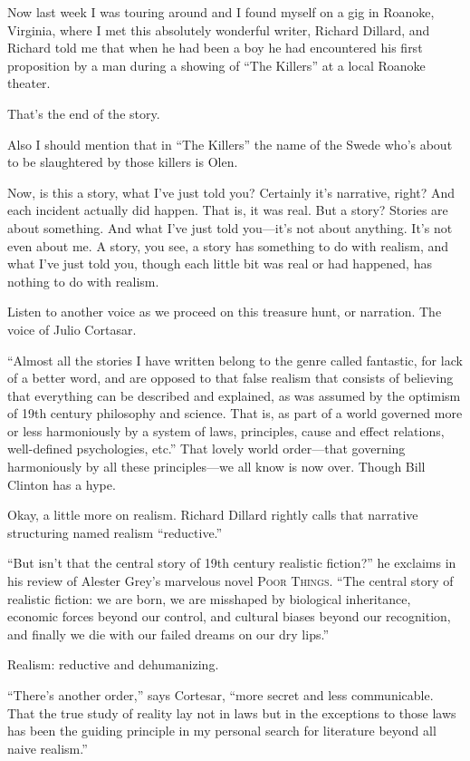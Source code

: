 \documentclass[
]{memoir}
\begin{document}
Now last week I was touring around and I found myself on a gig in
Roanoke, Virginia, where I met this absolutely wonderful writer, Richard
Dillard, and Richard told me that when he had been a boy he had
encountered his first proposition by a man during a showing of ``The
Killers'' at a local Roanoke theater.

That's the end of the story.

Also I should mention that in ``The Killers'' the name of the Swede
who's about to be slaughtered by those killers is Olen.

Now, is this a story, what I've just told you? Certainly it's narrative,
right? And each incident actually did happen. That is, it was real. But
a story? Stories are about something. And what I've just told you---it's
not about anything. It's not even about me. A story, you see, a story
has something to do with realism, and what I've just told you, though
each little bit was real or had happened, has nothing to do with
realism.

Listen to another voice as we proceed on this treasure hunt, or
narration. The voice of Julio Cortasar.

``Almost all the stories I have written belong to the genre called
fantastic, for lack of a better word, and are opposed to that false
realism that consists of believing that everything can be described and
explained, as was assumed by the optimism of 19th century philosophy and
science. That is, as part of a world governed more or less harmoniously
by a system of laws, principles, cause and effect relations,
well-defined psychologies, etc.'' That lovely world order---that
governing harmoniously by all these principles---we all know is now
over. Though Bill Clinton has a hype.

Okay, a little more on realism. Richard Dillard rightly calls that
narrative structuring named realism ``reductive.''

``But isn't that the central story of 19th century realistic fiction?''
he exclaims in his review of Alester Grey's marvelous novel \textsc{Poor
Things}. ``The central story of realistic fiction: we are born, we are
misshaped by biological inheritance, economic forces beyond our control,
and cultural biases beyond our recognition, and finally we die with our
failed dreams on our dry lips.''

Realism: reductive and dehumanizing.

``There's another order,'' says Cortesar, ``more secret and less
communicable. That the true study of reality lay not in laws but in the
exceptions to those laws has been the guiding principle in my personal
search for literature beyond all naive realism.''
\end{document}
